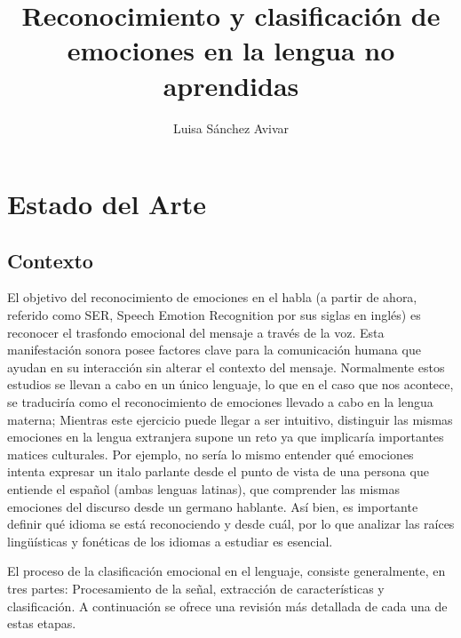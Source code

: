\documentclass[11pt,a4paper,spanish]{book}
\begin{document}
	\title{Reconocimiento y clasificación de emociones en la lengua no aprendidas}
	\author{Luisa Sánchez Avivar}
	
	
	\chapter{Estado del Arte}
	\section{Contexto}
	El objetivo del reconocimiento de emociones en el habla (a partir de ahora, referido como  SER, Speech Emotion Recognition por sus siglas en inglés) es reconocer el trasfondo emocional del mensaje a través de la voz.
	Esta manifestación sonora posee factores clave para la comunicación humana que ayudan en su interacción sin alterar el contexto del mensaje.
	Normalmente estos estudios se llevan a cabo en un único lenguaje, lo que en el caso que nos acontece, se traduciría como el reconocimiento de emociones llevado a cabo en la lengua materna; Mientras este ejercicio puede llegar a ser intuitivo, distinguir las mismas emociones en la lengua extranjera supone un reto ya que implicaría importantes matices culturales. Por ejemplo, no sería lo mismo entender qué emociones intenta expresar un italo parlante desde el punto de vista de una persona que entiende el español (ambas lenguas latinas), que comprender las mismas emociones del discurso desde un germano hablante. Así bien, es importante definir qué idioma se está reconociendo y desde cuál, por lo que analizar las raíces lingüísticas y fonéticas de los idiomas a estudiar es esencial. 
	
	El proceso de la clasificación emocional en el lenguaje, consiste generalmente, en tres partes: Procesamiento de la señal, extracción de características y clasificación. A continuación se ofrece una revisión más detallada de cada una de estas etapas.
		
\end{document}
